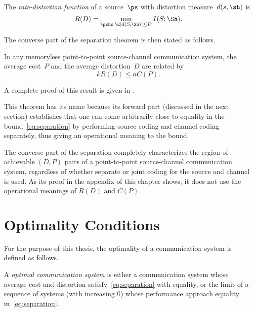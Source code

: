 \begin{definition}
  \label{def:ratedistortion}
  The \emph{rate-distortion function} of a source~$\ps$ with distortion
  measure~$d(s,\sh)$ is 
  \begin{equation*}
    R(D) = \min_{\pshs: \E[d(S,\Sh)] \le D} I(S;\Sh).
  \end{equation*}
\end{definition}

The converse part of the separation theorem is then stated as follows.

\begin{theorem}
  \label{thm:separationconverse}
  In any memoryless point-to-point source-channel communication system, the
  average cost~$P$ and the average distortion~$D$ are related by
  \begin{equation}
    \label{eq:separation}
    kR(D) \le nC(P).
  \end{equation}
\end{theorem}

A complete proof of this result is given in . 

This theorem has its name because its forward part (discussed in the next
section) establishes that one can come arbitrarily close to equality in the
bound~\eqref{eq:separation} by performing source coding and channel coding
separately, thus giving an operational meaning to the bound.

The converse part of the separation completely characterizes the region of
achievable $(D,P)$ pairs of a point-to-point source-channel communication
system, regardless of whether separate or joint coding for the source and
channel is used. As its proof in the appendix of this chapter shows, it does not
use the operational meanings of $R(D)$ and $C(P)$.


\section{Optimality Conditions}\label{sec:optimality}

For the purpose of this thesis, the optimality of a communication system is
defined as follows.

\begin{definition}
  \label{def:optimality}
  A \emph{optimal communication system} is either a communication system whose
  average cost and distortion satisfy~\eqref{eq:separation} with equality, or
  the limit of a sequence of systems (with increasing 0) whose
  performance approach equality in~\eqref{eq:separation}.
\end{definition}

